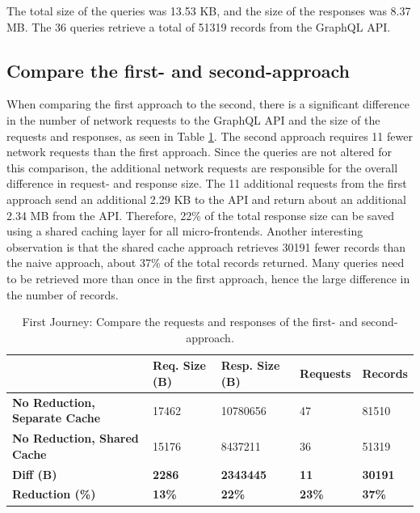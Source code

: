 \noindent The total size of the queries was 13.53 KB, and the size of the responses was 8.37 MB. The 36 queries retrieve a total of 51319 records from the GraphQL \ac{API}.

\subsection{Compare the first- and second-approach}\label{subsection:results:comparison-first-second-approach}

When comparing the first approach to the second, there is a significant difference in the number of network requests to the GraphQL \ac{API} and the size of the requests and responses, as seen in Table \ref{table:results:size-comparison-first-path-no-cache-no-reduction-cache-no-reduction}. The second approach requires 11 fewer network requests than the first approach. Since the queries are not altered for this comparison, the additional network requests are responsible for the overall difference in request- and response size. The 11 additional requests from the first approach send an additional 2.29 KB to the \ac{API} and return about an additional 2.34 MB from the \ac{API}. Therefore, 22\% of the total response size can be saved using a shared caching layer for all micro-frontends. Another interesting observation is that the shared cache approach retrieves 30191 fewer records than the naive approach, about 37\% of the total records returned. Many queries need to be retrieved more than once in the first approach, hence the large difference in the number of records.

\ifshowTables
\begin{table}[H]
  \begin{tabular}{|l|l|l|l|l|}
  \hline
    & \textbf{Req. Size (B)} & \textbf{Resp. Size (B)} & \textbf{Requests} & \textbf{Records} \\
    \hline
    \textbf{No Reduction, Separate Cache} & 17462 & 10780656 & 47 & 81510 \\
    \hline
    \textbf{No Reduction, Shared Cache} & 15176 & 8437211 & 36 & 51319 \\
    \hline
    \hline
    \textbf{Diff (B)} & \textbf{2286} & \textbf{2343445} & \textbf{11} & \textbf{30191} \\
    \hline
    \textbf{Reduction (\%)} & \textbf{13\%} & \textbf{22\%} & \textbf{23\%} & \textbf{37\%} \\
    \hline
  \end{tabular}
  \caption{First Journey: Compare the requests and responses of the first- and second-approach.}\label{table:results:size-comparison-first-path-no-cache-no-reduction-cache-no-reduction}
\end{table}
\fi

